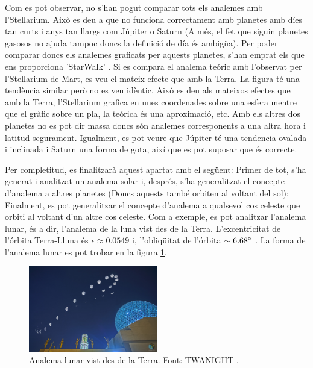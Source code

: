 \documentclass[a4paper, 11pt]{article}
\begin{document}
\vspace{2mm}

\noindent Com es pot observar, no s'han pogut comparar tots els analemes amb l'Stellarium. Això es deu a que no funciona correctament amb planetes amb díes tan curts i anys tan llargs com Júpiter o Saturn (A més, el fet que siguin planetes gasosos no ajuda tampoc doncs la definició de día és ambigüa). Per poder comparar doncs els analemes graficats per aquests planetes, s'han emprat els que ens proporciona 'StarWalk' \cite{STARWALK}. Si es compara el analema teóric amb l'observat per l'Stellarium de Mart, es veu el mateix efecte que amb la Terra. La figura té una tendència similar però no es veu idèntic. Això es deu als mateixos efectes que amb la Terra, l'Stellarium grafica en unes coordenades sobre una esfera mentre que el gràfic sobre un pla, la teórica és una aproximació, etc. Amb els altres dos planetes no es pot dir massa doncs són analemes corresponents a una altra hora i latitud segurament. Igualment, es pot veure que Júpiter té una tendencia ovalada i inclinada i Saturn una forma de gota, així que es pot suposar que és correcte.

\vspace{2mm}

\noindent Per completitud, es finalitzarà aquest apartat amb el següent: Primer de tot, s'ha generat i analitzat un analema solar i, després, s'ha generalitzat el concepte d'analema a altres planetes (Doncs aquests també orbiten al voltant del sol); Finalment, es pot generalitzar el concepte d'analema a qualsevol cos celeste que orbiti al voltant d'un altre cos celeste. Com a exemple, es pot analitzar l'analema lunar, és a dir, l'analema de la luna vist des de la Terra. L'excentricitat de l'órbita Terra-Lluna és $\epsilon \approx 0.0549$ i, l'obliqüitat de l'órbita $\sim 6.68 \degree$ \cite{LLUNA}. La forma de l'analema lunar es pot trobar en la figura \ref{fig:analema_luna}.

\begin{figure}[h!]
    \centering
    \includegraphics[width=0.50\textwidth]{images/analema_luna.jpg}
    \caption{Analema lunar vist des de la Terra. Font: TWANIGHT \cite{ANALEMA_MOON}.}
    \label{fig:analema_luna}
\end{figure}
\end{document}
